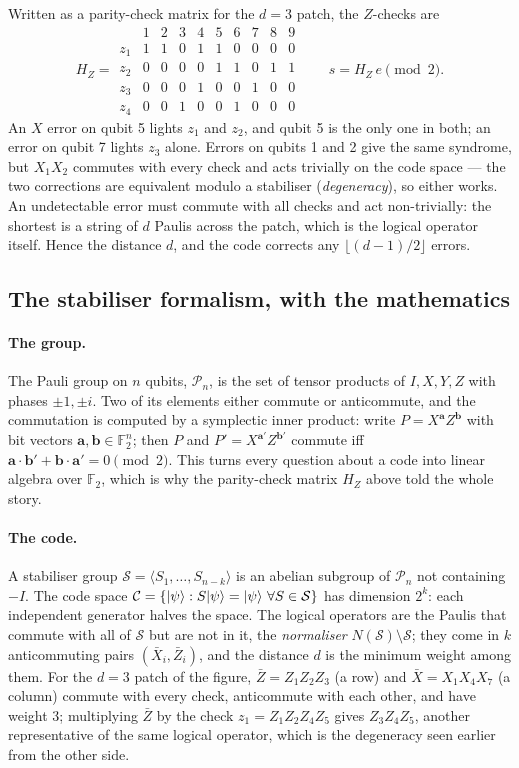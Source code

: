 \medskip
Written as a parity-check matrix for the $d=3$ patch, the $Z$-checks are
\[ H_Z=\begin{array}{r|ccccccccc}
    & 1&2&3&4&5&6&7&8&9\\ \hline
  z_1 & 1&1&0&1&1&0&0&0&0\\
  z_2 & 0&0&0&0&1&1&0&1&1\\
  z_3 & 0&0&0&1&0&0&1&0&0\\
  z_4 & 0&0&1&0&0&1&0&0&0\end{array}\qquad s=H_Z\,e\pmod2 . \]
An $X$ error on qubit 5 lights $z_1$ and $z_2$, and qubit 5 is the only one in both; an error on
qubit 7 lights $z_3$ alone. Errors on qubits 1 and 2 give the same syndrome, but $X_1X_2$
commutes with every check and acts trivially on the code space --- the two corrections are
equivalent modulo a stabiliser (\emph{degeneracy}), so either works. An undetectable error must
commute with all checks and act non-trivially: the shortest is a string of $d$ Paulis across the
patch, which is the logical operator itself. Hence the distance $d$, and the code corrects any
$\lfloor(d-1)/2\rfloor$ errors.

\subsection{The stabiliser formalism, with the mathematics}\label{ph:sec:stabmath}

\paragraph{The group.} The Pauli group on $n$ qubits, $\mathcal P_n$, is the set of tensor
products of $I,X,Y,Z$ with phases $\pm1,\pm i$. Two of its elements either commute or
anticommute, and the commutation is computed by a symplectic inner product: write
$P=X^{\mathbf a}Z^{\mathbf b}$ with bit vectors $\mathbf a,\mathbf b\in\mathbb F_2^n$; then
$P$ and $P'=X^{\mathbf a'}Z^{\mathbf b'}$ commute iff
$\mathbf a\cdot\mathbf b'+\mathbf b\cdot\mathbf a'=0\pmod2$. This turns every question about a
code into linear algebra over $\mathbb F_2$, which is why the parity-check matrix $H_Z$ above
told the whole story.

\paragraph{The code.} A stabiliser group $\mathcal S=\langle S_1,\dots,S_{n-k}\rangle$ is an
abelian subgroup of $\mathcal P_n$ not containing $-I$. The code space
$\mathcal C=\{\lvert \psi \rangle:S\lvert \psi \rangle=\lvert \psi \rangle\ \forall S\in\mathcal S\}$ has dimension $2^k$: each
independent generator halves the space. The logical operators are the Paulis that commute with
all of $\mathcal S$ but are not in it, the \emph{normaliser} $N(\mathcal S)\setminus\mathcal S$;
they come in $k$ anticommuting pairs $(\bar X_i,\bar Z_i)$, and the distance $d$ is the minimum
weight among them. For the $d=3$ patch of the figure, $\bar Z=Z_1Z_2Z_3$ (a row) and
$\bar X=X_1X_4X_7$ (a column) commute with every check, anticommute with each other, and have
weight $3$; multiplying $\bar Z$ by the check $z_1=Z_1Z_2Z_4Z_5$ gives $Z_3Z_4Z_5$, another
representative of the same logical operator, which is the degeneracy seen earlier from the other
side.

